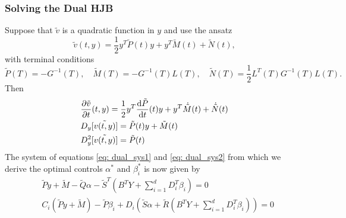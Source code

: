 
\subsubsection{Solving the Dual HJB}
Suppose that $\tilde{v}$ is a quadratic function in $y$ and use the ansatz
\begin{equation}
    \tilde{v}(t,y) = \frac12 y^T \tilde{P}(t) y + y^T \tilde{M}(t) + \tilde{N}(t),
\end{equation}
with terminal conditions
\begin{equation}
    \tilde{P}(T) = -G^{-1}(T), \quad \tilde{M}(T) = - G^{-1}(T)L(T), \quad \tilde{N}(T) = \frac12 L^T(T)G^{-1}(T)L(T). \label{eq: dual_terminal_conditions}
\end{equation}
Then
\begin{align*}
    &\frac{\partial \tilde{v}}{\partial t}(t, y) = \frac12 y^T \frac{\mathrm{d} \tilde{P}}{\mathrm{d} t}(t) y + y^T \dot{\tilde{M}}(t) + \dot{\tilde{N}}(t)\\
    &D_y[\tilde{v(t,y)}] = \tilde{P}(t) y + \tilde{M}(t)\\
    &D_y^2[\tilde{v(t,y)}] = \tilde{P}(t)
\end{align*}
The system of equations \eqref{eq: dual_sys1} and \eqref{eq: dual_sys2} from which we derive the optimal controls $\alpha^\ast$ and $\beta_i^\ast$ is now given by 
\begin{align*}
    &\tilde{P}y + \tilde{M} - \tilde{Q}\alpha - \tilde{S}^T (B^T Y + \sum_{i=1}^d D_i^T \beta_i) = 0\\
    &C_i (\tilde{P}y + \tilde{M}) - \tilde{P} \beta_i
    + D_i (\tilde{S}\alpha + \tilde{R}(B^T Y + \sum_{i=1}^d D_i^T \beta_i)) = 0
\end{align*}

